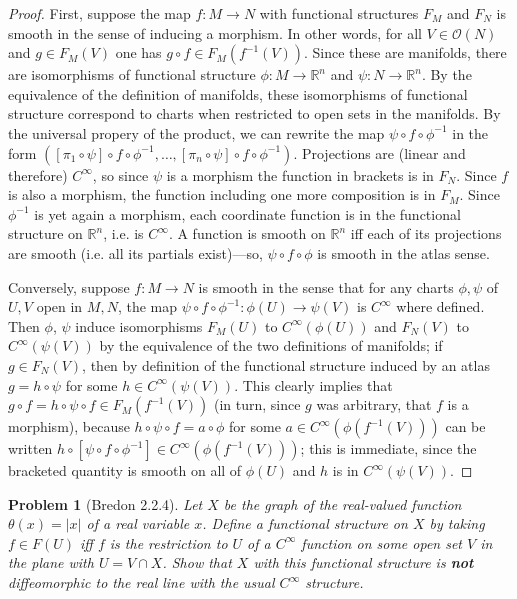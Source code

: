 \documentclass{article}
\newtheorem{plm}{Problem}
\begin{document}
\begin{proof}
  First, suppose the map $f: M \to N$ with functional structures $F_{M}$ and $F_{N}$ is smooth in the sense of inducing a morphism.
  In other words, for all $V \in \mathcal{O}(N)$ and $g \in F_{M}(V)$ one has $g \circ f \in F_{M}(f^{-1}(V))$.
  Since these are manifolds, there are isomorphisms of functional structure $\phi: M \to \mathbb{R}^{n}$ and $\psi: N \to \mathbb{R}^{n}$.
  By the equivalence of the definition of manifolds, these isomorphisms of functional structure correspond to charts
  when restricted to open sets in the manifolds.
  By the universal propery of the product, we can rewrite the map $\psi \circ f \circ \phi^{-1}$ in the form
  $([\pi_{1} \circ \psi] \circ f \circ \phi^{-1}, \ldots, [\pi_{n} \circ \psi]  \circ f \circ \phi^{-1})$.
  Projections are (linear and therefore) $C^{\infty}$, so since $\psi$ is a morphism the function in brackets is in $F_{N}$.
  Since $f$ is also a morphism, the function including one more composition is in $F_{M}$.
  Since $\phi^{-1}$ is yet again a morphism, each coordinate function is in the functional structure on $\mathbb{R}^{n}$, i.e. is $C^{\infty}$.
  A function is smooth on $\mathbb{R}^{n}$ iff each of its projections are smooth (i.e. all its partials exist)---so,
  $\psi \circ f \circ \phi$ is smooth in the atlas sense.

  Conversely, suppose $f : M \to N$ is smooth in the sense that for any charts $\phi, \psi$ of $U, V$ open in $M, N$, the map
  $\psi \circ f \circ \phi^{-1}: \phi(U) \to \psi(V)$ is $C^{\infty}$ where defined.
  Then $\phi$, $\psi$ induce isomorphisms $F_{M}(U)$ to $C^{\infty}(\phi(U))$ and $F_{N}(V)$ to $C^{\infty}(\psi(V))$
  by the equivalence of the two definitions of manifolds; if $g \in F_{N}(V)$, then by definition of the functional structure induced by an atlas
  $g = h \circ \psi$ for some $h \in C^{\infty}(\psi(V))$.
  This clearly implies that $g \circ f = h \circ \psi \circ f \in F_{M}(f^{-1}(V))$  (in turn, since $g$ was arbitrary, that $f$ is a morphism),
  because $h \circ \psi \circ f = a \circ \phi$ for some $a \in C^{\infty}(\phi(f^{-1}(V)))$
  can be written $h \circ [\psi \circ f \circ \phi^{-1}] \in C^{\infty}(\phi(f^{-1}(V)))$;
  this is immediate, since the bracketed quantity is smooth on all of $\phi(U)$ and $h$ is in $C^{\infty}(\psi(V))$.
\end{proof}

\begin{plm}[Bredon 2.2.4]
  Let $X$ be the graph of the real-valued function $\theta(x) = |x|$ of a real variable $x$.
  Define a functional structure on $X$ by taking $f \in F(U)$ iff $f$ is the restriction to $U$ of a $C^{\infty}$ function
  on some open set $V$ in the plane with $U = V \cap X$.
  Show that $X$ with this functional structure is \textbf{not} diffeomorphic to the real line with the usual $C^{\infty}$ structure.
\end{plm}
\end{document}
